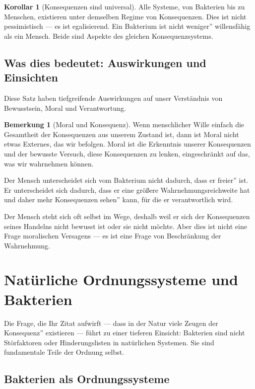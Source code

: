 \documentclass[a4paper,12pt]{article}
\theoremstyle{definition}
\newtheorem{bemerkung}{Bemerkung}
\newtheorem{korollar}{Korollar}
\begin{document}
\begin{korollar}[Konsequenzen sind universal]
Alle Systeme, von Bakterien bis zu Menschen, existieren unter demselben Regime von Konsequenzen. Dies ist nicht pessimistisch --- es ist egalisierend. Ein Bakterium ist nicht weniger'' willensfähig als ein Mensch. Beide sind Aspekte des gleichen Konsequenzsystems.
\end{korollar}

\subsection{Was dies bedeutet: Auswirkungen und Einsichten}

Diese Satz haben tiefgreifende Auswirkungen auf unser Verständnis von Bewusstsein, Moral und Verantwortung.

\begin{bemerkung}[Moral und Konsequenz]
Wenn menschlicher Wille einfach die Gesamtheit der Konsequenzen aus unserem Zustand ist, dann ist Moral nicht etwas Externes, das wir befolgen. Moral ist die Erkenntnis unserer Konsequenzen und der bewusste Versuch, diese Konsequenzen zu lenken, eingeschränkt auf das, was wir wahrnehmen können.

Der Mensch unterscheidet sich vom Bakterium nicht dadurch, dass er freier'' ist. Er unterscheidet sich dadurch, dass er eine größere Wahrnehmungsreichweite hat und daher mehr Konsequenzen sehen'' kann, für die er verantwortlich wird.

Der Mensch steht sich oft selbst im Wege, deshalb weil er sich der Konsequenzen seines Handelns nicht bewusst ist oder sie nicht möchte. Aber dies ist nicht eine Frage moralischen Versagens --- es ist eine Frage von Beschränkung der Wahrnehmung.
\end{bemerkung}

\section{Natürliche Ordnungssysteme und Bakterien}

Die Frage, die Ihr Zitat aufwirft --- dass in der Natur viele Zeugen der Konsequenz'' existieren --- führt zu einer tieferen Einsicht: Bakterien sind nicht Störfaktoren oder Hinderungslisten in natürlichen Systemen. Sie sind fundamentale Teile der Ordnung selbst.

\subsection{Bakterien als Ordnungssysteme}
\end{document}
